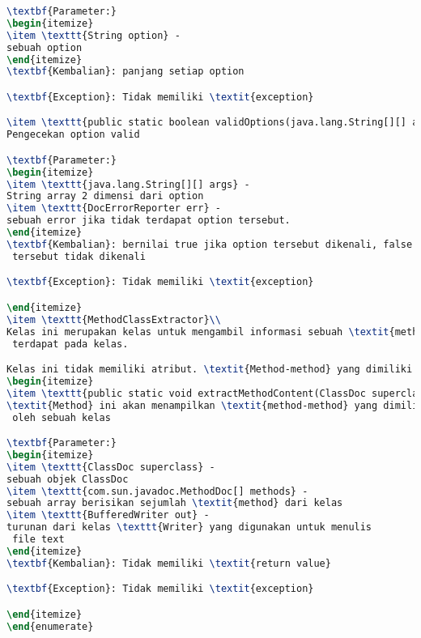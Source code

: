 \begin{lstlisting}[language=TeX, caption=Hasil Pengujian kode program perangkat punak]
\textbf{Parameter:}
\begin{itemize}
\item \texttt{String option} - 
sebuah option
\end{itemize}
\textbf{Kembalian}: panjang setiap option

\textbf{Exception}: Tidak memiliki \textit{exception}

\item \texttt{public static boolean validOptions(java.lang.String[][] args, DocErrorReporter err)}\\ 
Pengecekan option valid

\textbf{Parameter:}
\begin{itemize}
\item \texttt{java.lang.String[][] args} - 
String array 2 dimensi dari option
\item \texttt{DocErrorReporter err} - 
sebuah error jika tidak terdapat option tersebut.
\end{itemize}
\textbf{Kembalian}: bernilai true jika option tersebut dikenali, false jika option
 tersebut tidak dikenali

\textbf{Exception}: Tidak memiliki \textit{exception}

\end{itemize}
\item \texttt{MethodClassExtractor}\\ 
Kelas ini merupakan kelas untuk mengambil informasi sebuah \textit{method}
 terdapat pada kelas.

Kelas ini tidak memiliki atribut. \textit{Method-method} yang dimiliki kelas ini adalah sebagai berikut.
\begin{itemize}
\item \texttt{public static void extractMethodContent(ClassDoc superclass, com.sun.javadoc.MethodDoc[] methods, BufferedWriter out)}\\ 
\textit{Method} ini akan menampilkan \textit{method-method} yang dimiliki
 oleh sebuah kelas

\textbf{Parameter:}
\begin{itemize}
\item \texttt{ClassDoc superclass} - 
sebuah objek ClassDoc
\item \texttt{com.sun.javadoc.MethodDoc[] methods} - 
sebuah array berisikan sejumlah \textit{method} dari kelas
\item \texttt{BufferedWriter out} - 
turunan dari kelas \texttt{Writer} yang digunakan untuk menulis
 file text
\end{itemize}
\textbf{Kembalian}: Tidak memiliki \textit{return value}

\textbf{Exception}: Tidak memiliki \textit{exception}

\end{itemize}
\end{enumerate}

\end{lstlisting}

